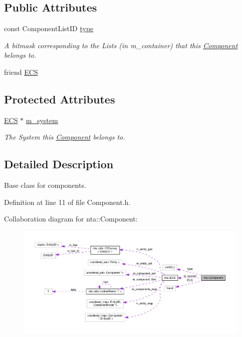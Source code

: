 \subsection*{Public Attributes}
\begin{DoxyCompactItemize}
\item 
\mbox{\label{classnta_1_1Component_a6c27f772281fd6ae13892386a75e7b4e}} 
const Component\+List\+ID \hyperlink{classnta_1_1Component_a6c27f772281fd6ae13892386a75e7b4e}{type}
\begin{DoxyCompactList}\small\item\em A bitmask corresponding to the Lists (in m\+\_\+container) that this \hyperlink{classnta_1_1Component}{Component} belongs to. \end{DoxyCompactList}\item 
friend \hyperlink{classnta_1_1Component_abed0426a01836855941e0236441eaf76}{E\+CS}
\end{DoxyCompactItemize}
\subsection*{Protected Attributes}
\begin{DoxyCompactItemize}
\item 
\mbox{\label{classnta_1_1Component_a382b6ded0bc1bfa123ac31a666d21b20}} 
\hyperlink{classnta_1_1ECS}{E\+CS} $\ast$ \hyperlink{classnta_1_1Component_a382b6ded0bc1bfa123ac31a666d21b20}{m\+\_\+system}
\begin{DoxyCompactList}\small\item\em The System this \hyperlink{classnta_1_1Component}{Component} belongs to. \end{DoxyCompactList}\end{DoxyCompactItemize}


\subsection{Detailed Description}
Base class for components. 

Definition at line 11 of file Component.\+h.



Collaboration diagram for nta\+:\+:Component\+:\nopagebreak
\begin{figure}[H]
\begin{center}
\leavevmode
\includegraphics[width=350pt]{d2/de4/classnta_1_1Component__coll__graph}
\end{center}
\end{figure}



